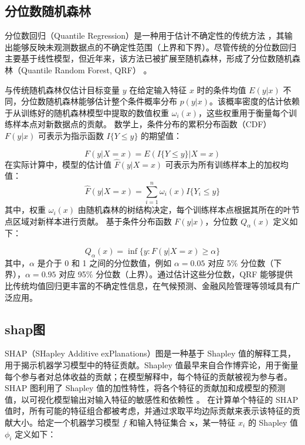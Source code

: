 \documentclass[AutoFakeBold]{LZUThesis-PgD&PhD}
\begin{document}
	\subsection{分位数随机森林}
	
	分位数回归（Quantile Regression）是一种用于估计不确定性的传统方法 \cite{koenker2005quantile}，其输出能够反映未观测数据点的不确定性范围（上界和下界）。尽管传统的分位数回归主要基于线性模型，但近年来，该方法已被扩展至随机森林，形成了分位数随机森林（Quantile Random Forest, QRF） \cite{meinshausen2006quantile}。
	
	与传统随机森林仅估计目标变量 \( y \) 在给定输入特征 \( x \) 时的条件均值 \( E(y|x) \) 不同，分位数随机森林能够估计整个条件概率分布 \( p(y|x) \)。该概率密度的估计依赖于从训练好的随机森林模型中提取的数值权重 \( \omega_i (x) \)，这些权重用于衡量每个训练样本点对新数据点的贡献。  
	数学上，条件分布的累积分布函数（CDF） \( F(y|x) \) 可表示为指示函数 \( I\{Y \leq y\} \) 的期望值：
	
	\begin{equation}
		F(y|X = x) = E (I\{Y \leq y\} |X = x)
	\end{equation}
	在实际计算中，模型的估计值 \( \hat{F}(y|X = x) \) 可表示为所有训练样本上的加权均值：
	\begin{equation}
		\hat{F}(y|X = x) = \sum_{i=1}^{n} \omega_i (x) I\{Y_i \leq y\}
	\end{equation}
	其中，权重 \( \omega_i (x) \) 由随机森林的树结构决定，每个训练样本点根据其所在的叶节点区域对新样本进行贡献。  基于条件分布函数 \( F(y|x) \)，分位数 \( Q_{\alpha}(x) \) 定义如下：
	
	\begin{equation}
		Q_{\alpha} (x) = \inf \{y : F(y|X = x) \geq \alpha \}
	\end{equation}
	其中，\( \alpha \) 是介于 0 和 1 之间的分位数值，例如 \( \alpha = 0.05 \) 对应 5\% 分位数（下界），\( \alpha = 0.95 \) 对应 95\% 分位数（上界）。通过估计这些分位数，QRF 能够提供比传统均值回归更丰富的不确定性信息，在气候预测、金融风险管理等领域具有广泛应用。
	
	\subsection{shap图}
	
	
	SHAP（SHapley Additive exPlanations）图是一种基于 Shapley 值的解释工具，用于揭示机器学习模型中的特征贡献。Shapley 值最早来自合作博弈论，用于衡量每个参与者对总体收益的贡献；在模型解释中，每个特征的贡献被视为参与者。SHAP 图利用了 Shapley 值的加性特性，将各个特征的贡献加和成模型的预测值，以可视化模型输出对输入特征的敏感性和依赖性 \cite{lundberg2017unified}。	在计算单个特征的 SHAP 值时，所有可能的特征组合都被考虑，并通过求取平均边际贡献来表示该特征的贡献大小。给定一个机器学习模型 \( f \) 和输入特征集合 \( \mathbf{x} \)，某一特征 \( x_i \) 的 Shapley 值 \( \phi_i \) 定义如下：
	
\end{document}
